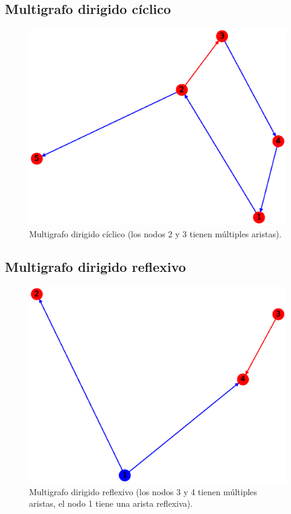 \documentclass{article}
\begin{document}
\subsection{Multigrafo dirigido cíclico}
\begin{figure}[H]
    \includegraphics[width=\textwidth]{11-MDC}
    \caption{Multigrafo dirigido cíclico (los nodos 2 y 3 tienen múltiples aristas).}
    \label{fig:MDC}
\end{figure}


\subsection{Multigrafo dirigido reflexivo}
\begin{figure}[H]
    \includegraphics[width=\textwidth]{12-MDR}
    \caption{Multigrafo dirigido reflexivo (los nodos 3 y 4 tienen múltiples aristas, el nodo 1 tiene una arista reflexiva).}
    \label{fig:MDR}
\end{figure}
\end{document}
